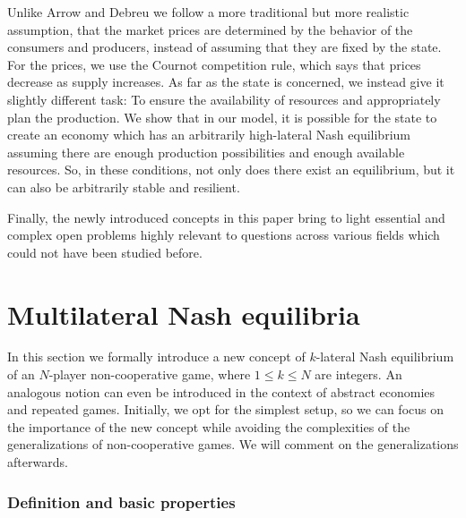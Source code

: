 \documentclass[a4paper,11pt,reqno,english]{amsart}
\theoremstyle{plain}
\theoremstyle{definition}
\begin{document}
\medskip
Unlike Arrow and Debreu we follow a more traditional but more realistic assumption, that the market prices are determined by the behavior of the consumers and producers, instead of assuming that they are fixed by the state. 
For the prices, we use the Cournot competition rule, which says that prices decrease as supply increases.
As far as the state is concerned, we instead give it slightly different task: To ensure the availability of resources and appropriately plan the production. 
We show that in our model, it is possible for the state to create an economy which has an arbitrarily high-lateral Nash equilibrium assuming there are enough production possibilities and enough available resources. 
So, in these conditions, not only does there exist an equilibrium, but it can also be arbitrarily stable and resilient.

\medskip
Finally, the newly introduced concepts in this paper bring to light essential and complex open problems highly relevant to questions across various fields which could not have been studied before. 
  

 
\part{Multilateral Nash equilibria}

In this section we formally introduce a new concept of $k$-lateral Nash equilibrium of an $N$-player non-cooperative game, where $1\leq k\leq N$ are integers.
An analogous notion can even be introduced in the context of abstract economies and repeated games. Initially, we opt for the simplest setup, so we can focus on the importance of the new concept while avoiding the complexities of the generalizations of non-cooperative games.
We will comment on the generalizations afterwards.


\section{Definition and basic properties}\label{sec:multilateral_nash_equilibria}
\end{document}
